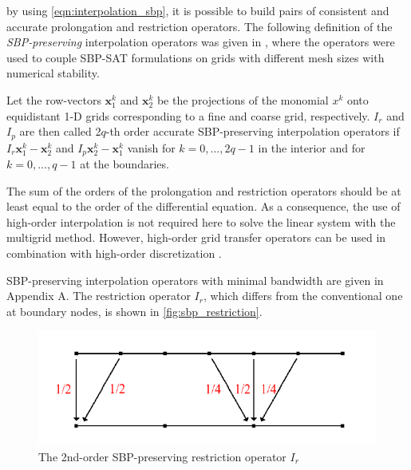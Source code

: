 by using \autoref{eqn:interpolation_sbp}, it is possible to build pairs of consistent and accurate prolongation and restriction operators. The following definition of the \textit{SBP-preserving} interpolation operators was given in \citep{RUGGIU2018216}, where the operators were used to couple SBP-SAT formulations on grids with different mesh sizes with numerical stability.



\begin{definition}
  Let the row-vectors $\mathbf{x}_1^k$ and $\mathbf{x}_2^k$ be the projections of the monomial $x^k$ onto equidistant 1-D grids corresponding to a fine and coarse grid, respectively. $I_r$ and $I_p$ are then called 2$q$-th order accurate SBP-preserving interpolation operators if $I_r\mathbf{x}_1^k - \mathbf{x}_2^k$ and $I_p\mathbf{x}_2^k - \mathbf{x}_1^k$ vanish for $k = 0, ...,2q-1$ in the interior and for $k=0,...,q-1$ at the boundaries.
\end{definition}


The sum of the orders of the prolongation and restriction operators should be at least equal to the order of the differential equation. As a consequence, the use of high-order interpolation is not required here to solve the linear system with the multigrid method. However, high-order grid transfer operators can be used in combination with high-order discretization \citep{sundar2015comparison}. 

SBP-preserving interpolation operators with minimal bandwidth are given in Appendix A. The restriction operator $I_r$, which differs from the conventional one at boundary nodes, is shown in \autoref{fig:sbp_restriction}.


\begin{figure}
    \centering
    \includegraphics{figures/sbp_restriction.png}
    \centering
    \caption{The 2nd-order SBP-preserving restriction operator $I_r$ \citep{RUGGIU2018216}}
    \label{fig:sbp_restriction}
\end{figure}




